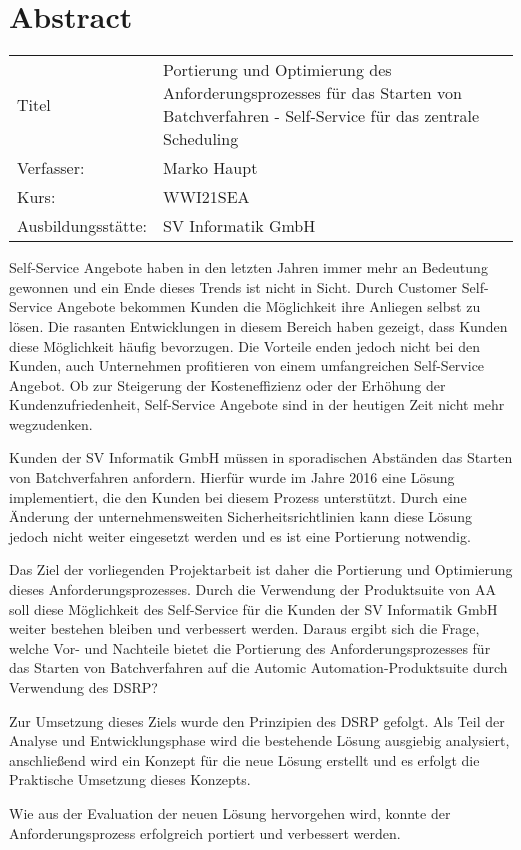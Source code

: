 \section*{Abstract}

	\begingroup
	\begin{table}[h!]
		\setlength\tabcolsep{0pt}
		\begin{tabular}{p{3.7cm}p{11.7cm}}
			Titel & Portierung und Optimierung des Anforderungsprozesses für das Starten von Batchverfahren - Self-Service für das zentrale Scheduling\\
			Verfasser: & Marko Haupt \\
			Kurs: & WWI21SEA \\
			Ausbildungsstätte: & SV Informatik GmbH\\
		\end{tabular}
	\end{table}
	\endgroup
	
	Self-Service Angebote haben in den letzten Jahren immer mehr an Bedeutung gewonnen und ein Ende dieses Trends ist nicht in Sicht. Durch Customer Self-Service Angebote bekommen Kunden die Möglichkeit ihre Anliegen selbst zu lösen. Die rasanten Entwicklungen in diesem Bereich haben gezeigt, dass Kunden diese Möglichkeit häufig bevorzugen. Die Vorteile enden jedoch nicht bei den Kunden, auch Unternehmen profitieren von einem umfangreichen Self-Service Angebot. Ob zur Steigerung der Kosteneffizienz oder der Erhöhung der Kundenzufriedenheit, Self-Service Angebote sind in der heutigen Zeit nicht mehr wegzudenken.
	
	Kunden der SV Informatik GmbH müssen in sporadischen Abständen das Starten von Batchverfahren anfordern. Hierfür wurde im Jahre 2016 eine Lösung implementiert, die den Kunden bei diesem Prozess unterstützt. Durch eine Änderung der unternehmensweiten Sicherheitsrichtlinien kann diese Lösung jedoch nicht weiter eingesetzt werden und es ist eine Portierung notwendig.
	
	Das Ziel der vorliegenden Projektarbeit ist daher die Portierung und Optimierung dieses Anforderungsprozesses. Durch die Verwendung der Produktsuite von \acf{AA} soll diese Möglichkeit des Self-Service für die Kunden der SV Informatik GmbH weiter bestehen bleiben und verbessert werden. Daraus ergibt sich die Frage, welche Vor- und Nachteile bietet die Portierung des Anforderungsprozesses für das Starten von Batchverfahren auf die Automic Automation-Produktsuite durch Verwendung des \acf{DSRP}?	
	        
    Zur Umsetzung dieses Ziels wurde den Prinzipien des \acf{DSRP} gefolgt. Als Teil der Analyse und Entwicklungsphase wird die bestehende Lösung ausgiebig analysiert, anschließend wird ein Konzept für die neue Lösung erstellt und es erfolgt die Praktische Umsetzung dieses Konzepts. 
    
    Wie aus der Evaluation der neuen Lösung hervorgehen wird, konnte der Anforderungsprozess erfolgreich portiert und verbessert werden.